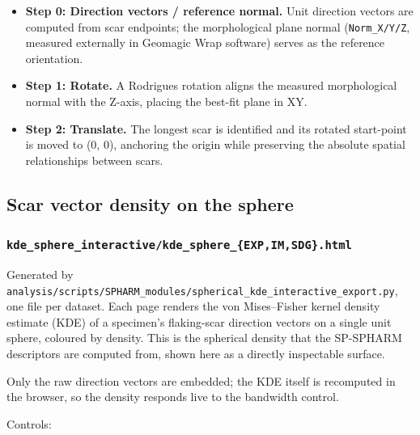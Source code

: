\documentclass[
  letterpaper,
  DIV=11,
  numbers=noendperiod]{scrartcl}
\providecommand{\tightlist}{%
  \setlength{\itemsep}{0pt}\setlength{\parskip}{0pt}}
\begin{document}
\begin{itemize}
\tightlist
\item
  \textbf{Step 0: Direction vectors / reference normal.} Unit direction
  vectors are computed from scar endpoints; the morphological plane
  normal (\texttt{Norm\_X/Y/Z}, measured externally in Geomagic Wrap
  software) serves as the reference orientation.
\item
  \textbf{Step 1: Rotate.} A Rodrigues rotation aligns the measured
  morphological normal with the Z-axis, placing the best-fit plane in
  XY.
\item
  \textbf{Step 2: Translate.} The longest scar is identified and its
  rotated start-point is moved to (0, 0), anchoring the origin while
  preserving the absolute spatial relationships between scars.
\end{itemize}

\subsection{Scar vector density on the
sphere}\label{scar-vector-density-on-the-sphere}

\subsubsection{\texorpdfstring{\texttt{kde\_sphere\_interactive/kde\_sphere\_\{EXP,IM,SDG\}.html}}{kde\_sphere\_interactive/kde\_sphere\_\{EXP,IM,SDG\}.html}}\label{kde_sphere_interactivekde_sphere_expimsdg.html}

Generated by
\texttt{analysis/scripts/SPHARM\_modules/spherical\_kde\_interactive\_export.py},
one file per dataset. Each page renders the von Mises--Fisher kernel
density estimate (KDE) of a specimen's flaking-scar direction vectors on
a single unit sphere, coloured by density. This is the spherical density
that the SP-SPHARM descriptors are computed from, shown here as a
directly inspectable surface.

Only the raw direction vectors are embedded; the KDE itself is
recomputed in the browser, so the density responds live to the bandwidth
control.

Controls:
\end{document}

